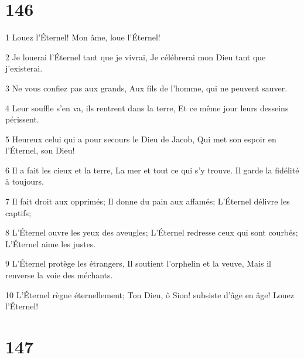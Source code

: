 \chapter{146}

\par 1 Louez l'Éternel! Mon âme, loue l'Éternel!
\par 2 Je louerai l'Éternel tant que je vivrai, Je célébrerai mon Dieu tant que j'existerai.
\par 3 Ne vous confiez pas aux grands, Aux fils de l'homme, qui ne peuvent sauver.
\par 4 Leur souffle s'en va, ils rentrent dans la terre, Et ce même jour leurs desseins périssent.
\par 5 Heureux celui qui a pour secours le Dieu de Jacob, Qui met son espoir en l'Éternel, son Dieu!
\par 6 Il a fait les cieux et la terre, La mer et tout ce qui s'y trouve. Il garde la fidélité à toujours.
\par 7 Il fait droit aux opprimés; Il donne du pain aux affamés; L'Éternel délivre les captifs;
\par 8 L'Éternel ouvre les yeux des aveugles; L'Éternel redresse ceux qui sont courbés; L'Éternel aime les justes.
\par 9 L'Éternel protège les étrangers, Il soutient l'orphelin et la veuve, Mais il renverse la voie des méchants.
\par 10 L'Éternel règne éternellement; Ton Dieu, ô Sion! subsiste d'âge en âge! Louez l'Éternel!

\chapter{147}

